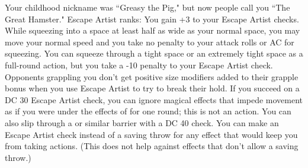 \skillfeat
{Your childhood nickname was ``Greasy the Pig," but now people call you ``The Great Hamster."}
{Escape Artist ranks:}
{You gain +3 to your Escape Artist checks.}
{While squeezing into a space at least half as wide as your normal space, you may move your normal speed and you take no penalty to your attack rolls or AC for squeezing.}
{You can squeeze through a tight space or an extremely tight space as a full-round action, but you take a -10 penalty to your Escape Artist check. Opponents grappling you don't get positive size modifiers added to their grapple bonus when you use Escape Artist to try to break their hold.}
{If you succeed on a DC 30 Escape Artist check, you can ignore magical effects that impede movement as if you were under the effects of  for one round; this is not an action. You can also slip through a  or similar barrier with a DC 40 check.}
{You can make an Escape Artist check instead of a saving throw for any effect that would keep you from taking actions. (This does not help against effects that don't allow a saving throw.)}